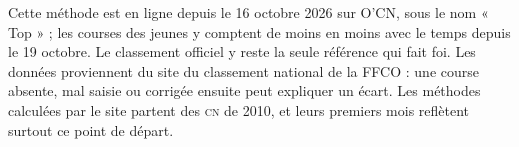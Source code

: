 \documentclass[11pt,a4paper]{article}
\newcommand{\CN}{\textsc{cn}}
\begin{document}
Cette méthode est en ligne depuis le 16 octobre 2026 sur O'CN, sous le nom « Top » ; les courses des jeunes y comptent de moins en moins avec le temps depuis le 19 octobre. Le classement officiel y reste la seule référence qui fait foi. Les données proviennent du site du classement national de la FFCO : une course absente, mal saisie ou corrigée ensuite peut expliquer un écart. Les méthodes calculées par le site partent des \CN{} de 2010, et leurs premiers mois reflètent surtout ce point de départ.
\end{document}
